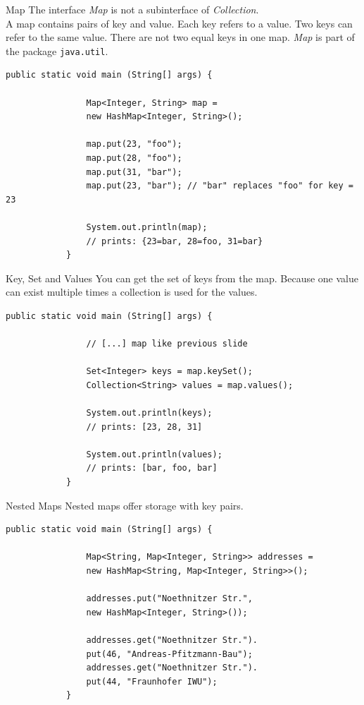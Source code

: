 	\begin{frame}[fragile]{Map}
		The interface \emph{Map} is not a subinterface of \emph{Collection}.\\
		A map contains pairs of key and value. Each key refers to a value. 
		Two keys can refer to the same value. There are not two equal keys in one map.
		\emph{Map} is part of the package \texttt{java.util}.
		\vfill
		\begin{lstlisting}[basicstyle=\ttfamily\scriptsize]
			public static void main (String[] args) {
				
				Map<Integer, String> map = 
				new HashMap<Integer, String>();
				
				map.put(23, "foo");
				map.put(28, "foo");
				map.put(31, "bar");
				map.put(23, "bar"); // "bar" replaces "foo" for key = 23
				
				System.out.println(map);
				// prints: {23=bar, 28=foo, 31=bar}
			}
		\end{lstlisting}
	\end{frame}
	
	\begin{frame}[fragile]{Key, Set and Values}
		You can get the set of keys from the map.
		Because one value can exist multiple times a collection is used for the values.
		\begin{lstlisting}[basicstyle=\ttfamily\scriptsize]
			public static void main (String[] args) {
				
				// [...] map like previous slide
				
				Set<Integer> keys = map.keySet();
				Collection<String> values = map.values();
				
				System.out.println(keys);
				// prints: [23, 28, 31]
				
				System.out.println(values);
				// prints: [bar, foo, bar]
			}
		\end{lstlisting}
	\end{frame}
	
	
	\begin{frame}[fragile]{Nested Maps}
		Nested maps offer storage with key pairs.
		\begin{lstlisting}[basicstyle=\ttfamily\scriptsize]
			public static void main (String[] args) {		
				
				Map<String, Map<Integer, String>> addresses = 
				new HashMap<String, Map<Integer, String>>();
				
				addresses.put("Noethnitzer Str.", 
				new HashMap<Integer, String>());
				
				addresses.get("Noethnitzer Str.").
				put(46, "Andreas-Pfitzmann-Bau");
				addresses.get("Noethnitzer Str.").
				put(44, "Fraunhofer IWU");
			}
		\end{lstlisting}
	\end{frame}
	
